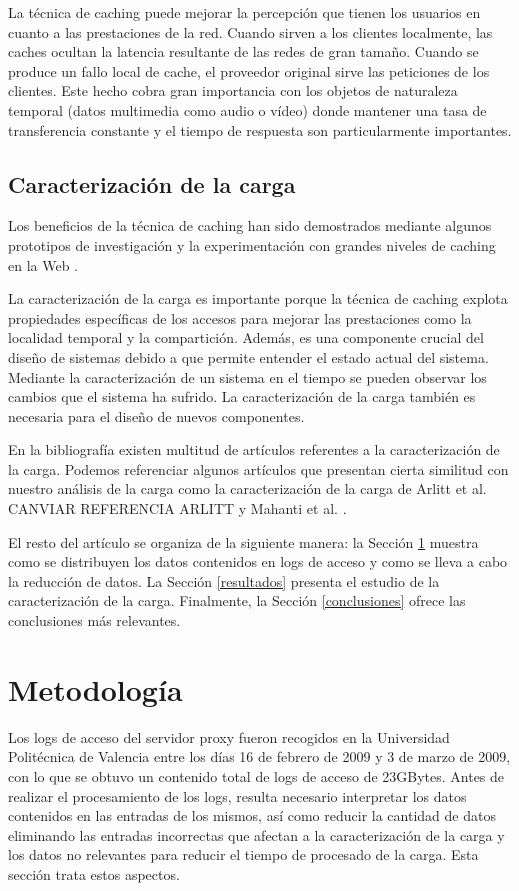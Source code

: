 \documentclass[twocolumn]{Jornadas}
\begin{document}
La técnica de caching puede mejorar la percepción que tienen los usuarios en cuanto a las prestaciones de la red. Cuando sirven a los clientes localmente, las caches ocultan la latencia resultante de las redes de gran tamaño. Cuando se produce un fallo local de cache, el proveedor original sirve las peticiones de los clientes.
Este hecho cobra gran importancia con los objetos de naturaleza temporal (datos multimedia como audio o vídeo) donde mantener una tasa de transferencia constante y el tiempo de respuesta son particularmente importantes.

\subsection{Caracterización de la carga}
Los beneficios de la técnica de caching han sido demostrados mediante algunos prototipos de investigación y la experimentación con grandes niveles de caching en la Web \cite{squid}. 

La caracterización de la carga es importante porque la técnica de caching explota propiedades específicas de los accesos para mejorar las prestaciones como la localidad temporal y la compartición. Además, es una componente crucial del diseño de sistemas debido a que permite entender el estado actual del sistema. Mediante la caracterización de un sistema en el tiempo se pueden observar los cambios que el sistema ha sufrido. La caracterización de la carga también es necesaria para el diseño de nuevos componentes.

En la bibliografía existen multitud de artículos referentes a la caracterización de la carga. Podemos referenciar algunos artículos que presentan cierta similitud con nuestro análisis de la carga como la caracterización de la carga de Arlitt et al. \cite{arlitt} CANVIAR REFERENCIA ARLITT y Mahanti et al. \cite{mahanti}.

El resto del artículo se organiza de la siguiente manera: la
Sección \ref{meto} muestra como se distribuyen los datos contenidos en logs de acceso y como se lleva a cabo la reducción de datos. La Sección \ref{resultados} presenta el estudio de la caracterización de la carga. Finalmente, la Sección \ref{conclusiones} ofrece las conclusiones más relevantes.

\section{Metodología}
\label{meto}

Los logs de acceso del servidor proxy fueron recogidos en la Universidad Politécnica de Valencia entre los días 16 de febrero de 2009 y 3 de marzo de 2009, con lo que se obtuvo un contenido total de logs de acceso de 23GBytes. Antes de realizar el procesamiento de los logs, resulta necesario interpretar los datos contenidos en las entradas de los mismos, así como reducir la cantidad de datos eliminando las entradas incorrectas que afectan a la caracterización de la carga y los datos no relevantes para reducir el tiempo de procesado de la carga. Esta sección trata estos aspectos.
\end{document}
